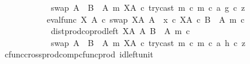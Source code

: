 \begin{isabellebody}
\ \ \ \ \ \ \ \ \ \ \ \ swap\ {\isacharparenleft}{\kern0pt}A\ {\isasymCoprod}\ {\isacharparenleft}{\kern0pt}B\ {\isasymsetminus}\ {\isacharparenleft}{\kern0pt}A{\isacharcomma}{\kern0pt}\ m{\isacharparenright}{\kern0pt}{\isacharparenright}{\kern0pt}{\isacharparenright}{\kern0pt}\ {\isacharparenleft}{\kern0pt}X\isactrlbsup A\isactrlesup {\isacharparenright}{\kern0pt}\ {\isasymcirc}\isactrlsub c\ {\isasymlangle}try{\isacharunderscore}{\kern0pt}cast\ m\ {\isasymcirc}\isactrlsub c\ m\ {\isasymcirc}\isactrlsub c\ a{\isacharcomma}{\kern0pt}\ g\ {\isasymcirc}\isactrlsub c\ z{\isasymrangle}\isanewline
\ \ \ \ \ \ \ \ \ \ {\isacharequal}{\kern0pt}\ {\isacharparenleft}{\kern0pt}eval{\isacharunderscore}{\kern0pt}func\ X\ A\ {\isasymcirc}\isactrlsub c\ swap\ {\isacharparenleft}{\kern0pt}X\isactrlbsup A\isactrlesup {\isacharparenright}{\kern0pt}\ A{\isacharparenright}{\kern0pt}\ {\isasymamalg}\ {\isacharparenleft}{\kern0pt}x\ {\isasymcirc}\isactrlsub c\ {\isasymbeta}\isactrlbsub X\isactrlbsup A\isactrlesup \ {\isasymtimes}\isactrlsub c\ {\isacharparenleft}{\kern0pt}B\ {\isasymsetminus}\ {\isacharparenleft}{\kern0pt}A{\isacharcomma}{\kern0pt}\ m{\isacharparenright}{\kern0pt}{\isacharparenright}{\kern0pt}\isactrlesub {\isacharparenright}{\kern0pt}\ {\isasymcirc}\isactrlsub c\isanewline
\ \ \ \ \ \ \ \ \ \ \ \ dist{\isacharunderscore}{\kern0pt}prod{\isacharunderscore}{\kern0pt}coprod{\isacharunderscore}{\kern0pt}left\ {\isacharparenleft}{\kern0pt}X\isactrlbsup A\isactrlesup {\isacharparenright}{\kern0pt}\ A\ {\isacharparenleft}{\kern0pt}B\ {\isasymsetminus}\ {\isacharparenleft}{\kern0pt}A{\isacharcomma}{\kern0pt}\ m{\isacharparenright}{\kern0pt}{\isacharparenright}{\kern0pt}\ {\isasymcirc}\isactrlsub c\isanewline
\ \ \ \ \ \ \ \ \ \ \ \ swap\ {\isacharparenleft}{\kern0pt}A\ {\isasymCoprod}\ {\isacharparenleft}{\kern0pt}B\ {\isasymsetminus}\ {\isacharparenleft}{\kern0pt}A{\isacharcomma}{\kern0pt}\ m{\isacharparenright}{\kern0pt}{\isacharparenright}{\kern0pt}{\isacharparenright}{\kern0pt}\ {\isacharparenleft}{\kern0pt}X\isactrlbsup A\isactrlesup {\isacharparenright}{\kern0pt}\ {\isasymcirc}\isactrlsub c\ {\isasymlangle}try{\isacharunderscore}{\kern0pt}cast\ m\ {\isasymcirc}\isactrlsub c\ m\ {\isasymcirc}\isactrlsub c\ a{\isacharcomma}{\kern0pt}\ h\ {\isasymcirc}\isactrlsub c\ z{\isasymrangle}{\isachardoublequoteclose}\isanewline
\ \ \ \ \ \ \ \ \ \ \ \ \isamarkupfalse%
\ cfunc{\isacharunderscore}{\kern0pt}cross{\isacharunderscore}{\kern0pt}prod{\isacharunderscore}{\kern0pt}comp{\isacharunderscore}{\kern0pt}cfunc{\isacharunderscore}{\kern0pt}prod\ id{\isacharunderscore}{\kern0pt}left{\isacharunderscore}{\kern0pt}unit{}\ \isamarkupfalse%

\end{isabellebody}
